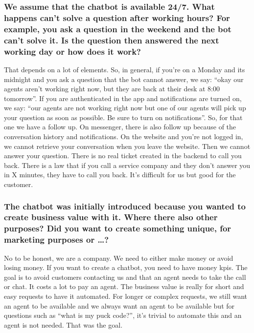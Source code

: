 \begin{appendices}
	\subsubsection{We assume that the chatbot is available 24/7. What happens can’t solve a question after working hours? For example, you ask a question in the weekend and the bot can’t solve it. Is the question then answered the next working day or how does it work?}
	That depends on a lot of elements. So, in general, if you’re on a Monday and its midnight and you ask a question that the bot cannot answer, we say: “okay our agents aren’t working right now, but they are back at their desk at 8:00 tomorrow”. If you are authenticated in the app and notifications are turned on, we say: “our agents are not working right now but one of our agents will pick up your question as soon as possible. Be sure to turn on notifications”. So, for that one we have a follow up. On messenger, there is also follow up because of the conversation history and notifications. On the website and you’re not logged in, we cannot retrieve your conversation when you leave the website. Then we cannot answer your question. There is no real ticket created in the backend to call you back. There is a law that if you call a service company and they don’t answer you in X minutes, they have to call you back. It’s difficult for us but good for the customer.
	
	\subsubsection{The chatbot was initially introduced because you wanted to create business value with it. Where there also other purposes? Did you want to create something unique, for marketing purposes or …?}
	No to be honest, we are a company. We need to either make money or avoid losing money. If you want to create a chatbot, you need to have money \acrshort{kpi}s. The goal is to avoid customers contacting us and that an agent needs to take the call or chat. It costs a lot to pay an agent. The business value is really for short and easy requests to have it automated. For longer or complex requests, we still want an agent to be available and we always want an agent to be available but for questions such as “what is my puck code?”, it’s trivial to automate this and an agent is not needed. That was the goal.
	

\end{appendices}
